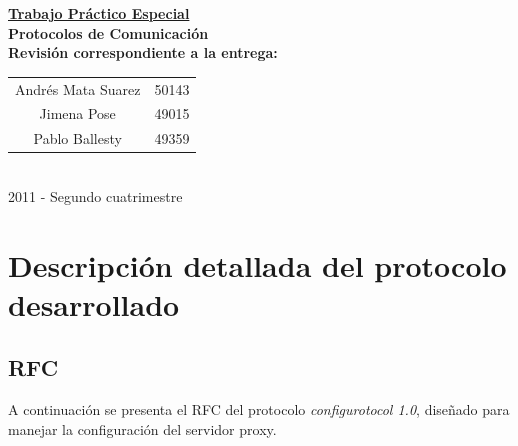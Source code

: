 \documentclass[a4paper,10pt]{article}
\begin{document}
\begin{titlepage}
\begin{center}
 \huge \underline{\textbf{Trabajo Práctico Especial}}\\[0.05cm]
 \normalsize \textbf{Protocolos de Comunicación}\\[0.25cm]
 \normalsize \textbf{Revisión correspondiente a la entrega: }\\[1cm]

\large
\begin{tabular}{c @{ - } l}
 Andrés Mata Suarez & 50143 \\
 Jimena Pose & 49015 \\
 Pablo Ballesty & 49359 \\
\end{tabular}\\[19.4cm]
 2011 - Segundo cuatrimestre
\end{center}

\end{titlepage}

\setcounter{tocdepth}{2}
\tableofcontents


\newpage

\section{Descripción detallada del protocolo desarrollado}

\subsection{RFC}
A continuación se presenta el RFC del protocolo \textit{configurotocol 1.0}, diseñado para manejar la configuración
del servidor proxy.


\end{document}
